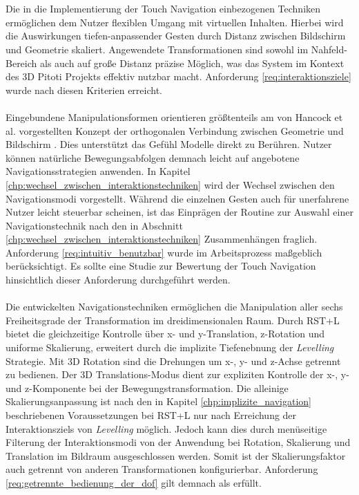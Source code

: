 \\\\
Die in die Implementierung der Touch Navigation einbezogenen Techniken ermöglichen dem Nutzer flexiblen Umgang mit virtuellen Inhalten. Hierbei wird die Auswirkungen tiefen-anpassender Gesten durch Distanz zwischen Bildschirm und Geometrie skaliert. Angewendete Transformationen sind sowohl im Nahfeld-Bereich als auch auf große Distanz präzise Möglich, was das System im Kontext des 3D Pitoti Projekts effektiv nutzbar macht. Anforderung \ref{req:interaktionsziele} wurde nach diesen Kriterien erreicht.
\\\\
Eingebundene Manipulationsformen orientieren größtenteils am von Hancock et al. vorgestellten Konzept der orthogonalen Verbindung zwischen Geometrie und Bildschirm \cite{hancock:2007,hancock:2009}. Dies unterstützt das Gefühl Modelle direkt zu Berühren. Nutzer können natürliche Bewegungsabfolgen demnach leicht auf angebotene Navigationsstrategien anwenden. In Kapitel \ref{chp:wechsel_zwischen_interaktionstechniken} wird der Wechsel zwischen den Navigationsmodi vorgestellt. Während die einzelnen Gesten auch für unerfahrene Nutzer leicht steuerbar scheinen, ist das Einprägen der Routine zur Auswahl einer Navigationstechnik nach den in Abschnitt \ref{chp:wechsel_zwischen_interaktionstechniken} Zusammenhängen fraglich. Anforderung \ref{req:intuitiv_benutzbar} wurde im Arbeitsprozess maßgeblich berücksichtigt. Es sollte eine Studie zur Bewertung der Touch Navigation hinsichtlich dieser Anforderung durchgeführt werden. 
\\\\
Die entwickelten Navigationstechniken ermöglichen die Manipulation aller sechs Freiheitsgrade der Transformation im dreidimensionalen Raum. Durch RST+L bietet die gleichzeitige Kontrolle über x- und y-Translation, z-Rotation und uniforme Skalierung, erweitert durch die implizite Tiefenebnung der \emph{Levelling} Strategie. Mit 3D Rotation sind die Drehungen um x-, y- und z-Achse getrennt zu bedienen. Der 3D Translations-Modus dient zur expliziten Kontrolle der x-, y- und z-Komponente bei der Bewegungstransformation. Die alleinige Skalierungsanpassung ist nach den in Kapitel \ref{chp:implizite_navigation} beschriebenen Voraussetzungen bei RST+L nur nach Erreichung der Interaktionsziels von \emph{Levelling} möglich. Jedoch kann dies durch menüseitige Filterung der Interaktionsmodi von der Anwendung bei Rotation, Skalierung und Translation im Bildraum ausgeschlossen werden. Somit ist der Skalierungsfaktor auch getrennt von anderen Transformationen konfigurierbar. Anforderung \ref{req:getrennte_bedienung_der_dof} gilt demnach als erfüllt.
